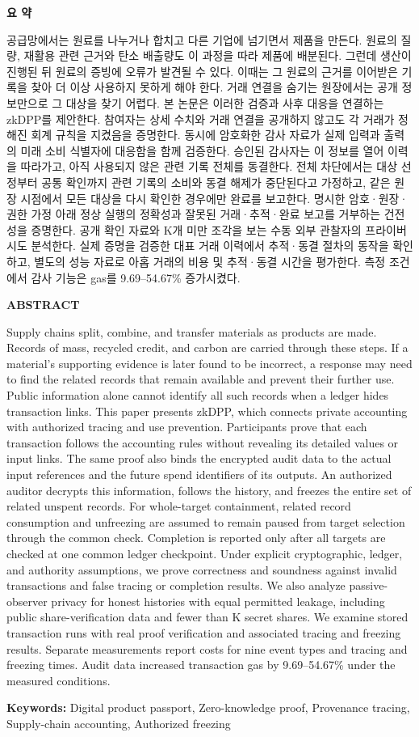 \begin{center}\textbf{요 약}\end{center}
공급망에서는 원료를 나누거나 합치고 다른 기업에 넘기면서 제품을 만든다.
원료의 질량, 재활용 관련 근거와 탄소 배출량도 이 과정을 따라
제품에 배분된다. 그런데 생산이 진행된 뒤 원료의 증빙에 오류가
발견될 수 있다. 이때는 그 원료의 근거를 이어받은 기록을 찾아
더 이상 사용하지 못하게 해야 한다. 거래 연결을 숨기는 원장에서는
공개 정보만으로 그 대상을 찾기 어렵다.
본 논문은 이러한 검증과 사후 대응을 연결하는 zkDPP를 제안한다.
참여자는 상세 수치와 거래 연결을 공개하지 않고도 각 거래가
정해진 회계 규칙을 지켰음을 증명한다. 동시에 암호화한 감사 자료가
실제 입력과 출력의 미래 소비 식별자에 대응함을 함께 검증한다.
승인된 감사자는 이 정보를
열어 이력을 따라가고, 아직 사용되지 않은 관련 기록 전체를 동결한다.
전체 차단에서는 대상 선정부터 공통 확인까지 관련 기록의 소비와
동결 해제가 중단된다고 가정하고, 같은 원장 시점에서 모든 대상을
다시 확인한 경우에만 완료를 보고한다. 명시한 암호·원장·권한 가정 아래 정상 실행의
정확성과 잘못된 거래·추적·완료 보고를 거부하는 건전성을 증명한다.
공개 확인 자료와 K개 미만 조각을 보는 수동 외부 관찰자의
프라이버시도 분석한다. 실제 증명을 검증한 대표 거래 이력에서
추적·동결 절차의 동작을 확인하고, 별도의 성능 자료로
아홉 거래의 비용 및 추적·동결 시간을 평가한다.
측정 조건에서 감사 기능은 gas를 9.69--54.67\% 증가시켰다.

\begin{center}\textbf{ABSTRACT}\end{center}
Supply chains split, combine, and transfer materials as products are made.
Records of mass, recycled credit, and carbon are carried through these
steps. If a material's supporting evidence is later found to be incorrect,
a response may need to find the related records that remain available
and prevent their further use. Public information alone cannot identify
all such records when a ledger hides transaction links.
This paper presents zkDPP, which connects private accounting with
authorized tracing and use prevention. Participants prove that each
transaction follows the accounting rules without revealing its detailed
values or input links. The same proof also binds the encrypted audit data
to the actual input references and the future spend identifiers of its
outputs. An authorized auditor decrypts this information, follows the
history, and freezes the entire set of related unspent records.
For whole-target containment, related record consumption and unfreezing
are assumed to remain paused from target selection through the common
check. Completion is reported only after all targets are checked at one
common ledger checkpoint. Under explicit cryptographic, ledger, and authority
assumptions, we prove correctness and soundness against invalid transactions
and false tracing or completion results. We also analyze passive-observer
privacy for honest histories with equal permitted leakage, including public
share-verification data and fewer than K secret shares.
We examine stored transaction runs with real proof verification and
associated tracing and freezing results. Separate
measurements report costs for nine event types and tracing and freezing
times. Audit data increased transaction gas by
9.69--54.67\% under the measured conditions.

\smallskip
\noindent\textbf{Keywords:} Digital product passport, Zero-knowledge proof,
Provenance tracing, Supply-chain accounting, Authorized freezing
\medskip
